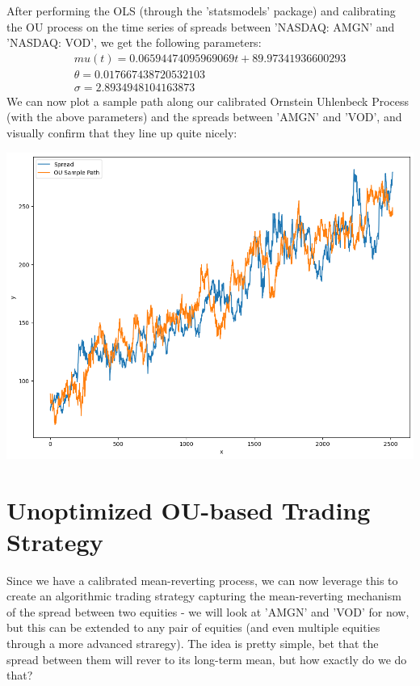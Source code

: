 \documentclass{article}
\begin{document}
\begin{spacing}{2.0}
After performing the OLS (through the 'statsmodels' package) and
calibrating the OU process on the time series of spreads between 'NASDAQ: AMGN' and 'NASDAQ: VOD', we get the following parameters:
\begin{gather*}
    mu(t) = 0.06594474095969069t + 89.97341936600293 \\
    \theta = 0.017667438720532103 \\
    \sigma = 2.8934948104163873
\end{gather*}
We can now plot a sample path along our calibrated Ornstein Uhlenbeck Process (with the above parameters) and the spreads between 'AMGN' and 'VOD', and visually confirm that they
line up quite nicely:
\begin{center}
    \includegraphics[scale=0.35]{./images/calibrated_ou_sample_path_amgn_vod.png}
\end{center}

\section{Unoptimized OU-based Trading Strategy}

Since we have a calibrated mean-reverting process, we can now leverage this to create an algorithmic trading strategy capturing the mean-reverting mechanism of the spread between two
equities - we will look at 'AMGN' and 'VOD' for now, but this can be extended to any pair of equities (and even multiple equities through a more advanced straregy). The idea is pretty
simple, bet that the spread between them will rever to its long-term mean, but how exactly do we do that?


\end{spacing}
\end{document}
